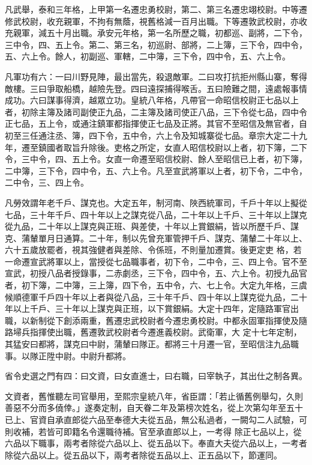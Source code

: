 \begin{pinyinscope}
 凡武舉，泰和三年格，上甲第一名遷忠勇校尉，第二、第三名遷忠翊校尉。中等遷修武校尉，收充親軍，不拘有無蔭，視舊格減一百月出職。下等遷敦武校尉，亦收充親軍，減五十月出職。承安元年格，第一名所歷之職，初都巡、副將，二下令，三中令，四、五上令。第二、第三名，初巡尉、部將，二上簿，三下令，四中令，五、六上令。餘人，初副巡、軍轄，二中簿，三下令，四中令，五、六上令。



 凡軍功有六：一曰川野見陣，最出當先，殺退敵軍。二曰攻打抗拒州縣山寨，奪得敵樓。三曰爭取船橋，越險先登。四曰遠探捕得喉舌。五曰險難之間，遠處報事情成功。六曰謀事得濟，越眾立功。皇統八年格，凡帶官一命昭信校尉正七品以上者，初除主簿及諸司副使正九品，二主簿及諸司使正八品，三下令從七品，四中令正七品，五上令，或通注鎮軍都指揮使正七品及正將。其官不至昭信及無官者，自初至三任通注丞、簿，四下令，五中令，六上令及知城寨從七品。章宗大定二十九年，遷至鎮國者取旨升除後。吏格之所定，女直人昭信校尉以上者，初下簿，二下
 令，三中令，四、五上令。女直一命遷至昭信校尉、餘人至昭信已上者，初下簿，二中簿，三下令，四中令，五、六上令。凡至宣武將軍以上者，初下令，二中令，二中令，三、四上令。



 凡勞效謂年老千戶、謀克也。大定五年，制河南、陜西統軍司，千戶十年以上擬從七品，三十年千戶、四十年以上之謀克從八品，二十年以上千戶、三十年以上謀克從九品，二十年以上謀克與正班、與差使，十年以上賞銀絹，皆以所歷千戶、謀克、蒲輦單月日通算。二十年，制以先曾充軍管押千戶、謀克、蒲輦二十年以上、六十五歲放罷者，視其強健者與差除、令係班，不則量加遷賞。後更定吏
 格，若一命遷宣武將軍以上，當授從七品職事者，初下令，二中令，三、四上令。官不至宣武，初授八品者授錄事，二赤劇丞，三下令，四中令，五、六上令。初授九品官者，初下簿，二中簿，三上簿，四下令，五中令，六、七上令。大定九年格，三虞候順德軍千戶四十年以上者與從八品，三十年千戶、四十年以上謀克從九品，二十年以上千戶、三十年以上謀克與正班，以下賞銀絹。大定十四年，定隨路軍官出職，以新制從下創添兩重，舊遷忠武校尉者今遷忠勇校尉。中都永固軍指揮使及隨路埽兵指揮使出職，舊遷敦武校尉者今遷進義校尉。武衛軍，大
 定十七年定制，其猛安曰都將，謀克曰中尉，蒲輦曰隊正。都將三十月遷一官，至昭信注九品職事。以隊正陞中尉。中尉升都將。



 省令史選之門有四：曰文資，曰女直進士，曰右職，曰宰執子，其出仕之制各異。



 文資者，舊惟聽左司官舉用，至熙宗皇統八年，省臣謂：「若止循舊例舉勾，久則善惡不分而多僥倖。」遂奏定制，自天眷二年及第榜次姓名，從上次第勾年至五十已上、官資自承直郎從六品至奉德大夫從五品，無公私過者，一闕勾二人試驗，可則收補，若皆可即籍名令還職待補。官至承直郎以上，一考得
 除正七品以上，從六品以下職事，兩考者除從六品以上、從五品以下。奉直大夫從六品以上，一考者除從六品以上。從五品以下，兩考者除從五品以上、正五品以下，節運同。




\end{pinyinscope}
